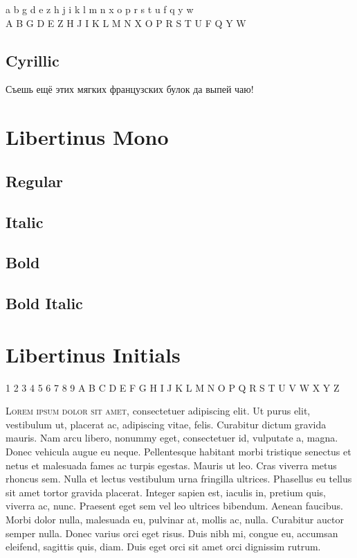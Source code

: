 \documentclass{article}
\begin{document}
{\ifxetex\else\ifluatex\else\libertinussanslgr\fi\fi
\noindent
 a b g d e z h j i k l m n x o p r s t u f q y w\\
 A B G D E Z H J I K L M N X O P R S T U F Q Y W\\
}

\subsection*{Cyrillic}

{\ifxetex\else\ifluatex\else{}\selectfont\fi\fi
Съешь ещё этих мягких французских булок да
выпей чаю!}

\clearpage

\section{Libertinus Mono}

\ttfamily


\subsection*{Regular}
\lipsum[1]

\subsection*{Italic}
\textit{\lipsum[1]}

\subsection*{Bold}
\textbf{\lipsum[1]}

\subsection*{Bold Italic}

\textbf{\textit{\lipsum[1]}}

\section{Libertinus Initials}
\rm

{\Huge{} 1 2 3 4 5 6 7 8 9 A B C D E F G H I J K L M N O P Q R S T U V W X Y Z}

\lettrine[lines=3,nindent=0pt]{\LibertinusInitials L}{orem ipsum dolor sit amet}, consectetuer adipiscing elit. Ut purus elit, vestibulum
ut, placerat ac, adipiscing vitae, felis. Curabitur dictum gravida mauris. Nam arcu
libero, nonummy eget, consectetuer id, vulputate a, magna. Donec vehicula augue eu
neque. Pellentesque habitant morbi tristique senectus et netus et malesuada fames
ac turpis egestas. Mauris ut leo. Cras viverra metus rhoncus sem. Nulla et lectus
vestibulum urna fringilla ultrices. Phasellus eu tellus sit amet tortor gravida placerat.
Integer sapien est, iaculis in, pretium quis, viverra ac, nunc. Praesent eget sem vel
leo ultrices bibendum. Aenean faucibus. Morbi dolor nulla, malesuada eu, pulvinar
at, mollis ac, nulla. Curabitur auctor semper nulla. Donec varius orci eget risus. Duis
nibh mi, congue eu, accumsan eleifend, sagittis quis, diam. Duis eget orci sit amet orci
dignissim rutrum.
\end{document}
